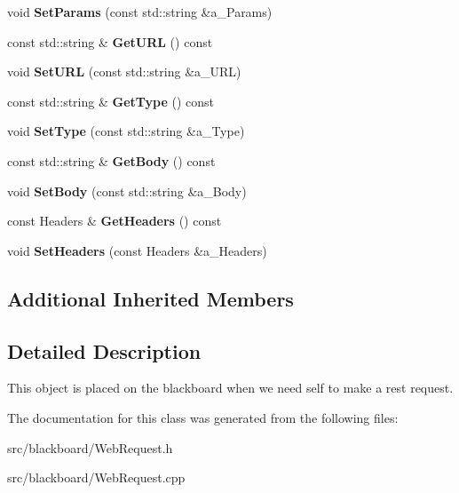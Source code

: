 \begin{DoxyCompactItemize}
\mbox{\label{class_web_request_af97e90be0c5bfcc6116211d830f36caf}} 
void {\bfseries Set\+Params} (const std\+::string \&a\+\_\+\+Params)
\item 
\mbox{\label{class_web_request_a1d2a221a046a197f157c2ff761c960b7}} 
const std\+::string \& {\bfseries Get\+U\+RL} () const
\item 
\mbox{\label{class_web_request_a4588c8b06f1528072d3df19774c4098d}} 
void {\bfseries Set\+U\+RL} (const std\+::string \&a\+\_\+\+U\+RL)
\item 
\mbox{\label{class_web_request_a8202a3c26c0a6e59ac07a362b84cc194}} 
const std\+::string \& {\bfseries Get\+Type} () const
\item 
\mbox{\label{class_web_request_a3119e23b55ac5051d9c6b12ca52b7297}} 
void {\bfseries Set\+Type} (const std\+::string \&a\+\_\+\+Type)
\item 
\mbox{\label{class_web_request_a4e58f5b57fdb71454c992d00926352aa}} 
const std\+::string \& {\bfseries Get\+Body} () const
\item 
\mbox{\label{class_web_request_a73904b641c4ca45ff1e769c5a2aaf58d}} 
void {\bfseries Set\+Body} (const std\+::string \&a\+\_\+\+Body)
\item 
\mbox{\label{class_web_request_ac08a96aae3d884d06156ca76baae9b72}} 
const Headers \& {\bfseries Get\+Headers} () const
\item 
\mbox{\label{class_web_request_a10d848464ce1c43e7cc6213ef5d7988b}} 
void {\bfseries Set\+Headers} (const Headers \&a\+\_\+\+Headers)
\end{DoxyCompactItemize}
\subsection*{Additional Inherited Members}


\subsection{Detailed Description}
This object is placed on the blackboard when we need self to make a rest request. 

The documentation for this class was generated from the following files\+:\begin{DoxyCompactItemize}
\item 
src/blackboard/Web\+Request.\+h\item 
src/blackboard/Web\+Request.\+cpp\end{DoxyCompactItemize}
